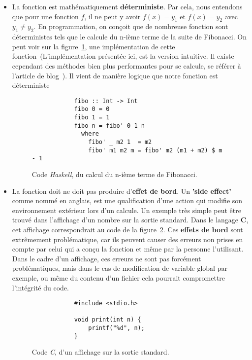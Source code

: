 \begin{itemize}
    \item[\textbullet] La fonction est mathématiquement 
    \textbf{déterministe}. Par cela, nous entendons que pour une fonction \(f\), 
    il ne peut y avoir \(f(x) = y_1\) et \(f(x) = y_2\) avec \(y_1 \neq y_2\). 
    En programmation, on conçoit que de nombreuse fonction 
    sont déterministes tels que le calcule du n-ième terme de la suite de 
    Fibonacci. On peut voir sur la figure~\ref{fig:progFiboHaskell}, une 
    implémentation de cette fonction~(L'implémentation présentée ici, est la 
    version intuitive. Il existe cependant des méthodes bien plus performantes 
    pour se calcule, se référer à l'article de blog~\cite{citationFiboProg}).
    Il vient de manière logique que notre fonction est déterministe
    \begin{figure}[H]
        \begin{verbatim}
            fibo :: Int -> Int
            fibo 0 = 0
            fibo 1 = 1
            fibo n = fibo' 0 1 n
              where
                fibo' _ m2 1  = m2
                fibo' m1 m2 m = fibo' m2 (m1 + m2) $ m - 1
        \end{verbatim}
        \caption{
            Code \textit{Haskell}, du calcul du n-ième terme de Fibonacci.
        }\label{fig:progFiboHaskell}
    \end{figure}

    \item[\textbullet] La fonction doit ne doit pas produire 
    d'\textbf{effet de bord}. Un \textbf{'side effect'} comme nommé en anglais, 
    est une qualification d'une action qui modifie son environnement extérieur 
    lors d'un calcule. Un exemple très simple peut être trouvé dans l'affichage 
    d'un nombre sur la sortie standard. Dans le langage \textbf{C},
    cet affichage correspondrait au code de la figure~\ref{fig:progAfficheC}.
    Ces \textbf{effets de bord} sont extrêmement problématique, car ils 
    peuvent causer des erreurs non prises en compte par celui qui a conçu la 
    fonction et même par la personne l'utilisant. Dans le cadre d'un affichage, 
    ces erreurs ne sont pas forcément problématiques, mais dans le cas de 
    modification de variable global par exemple, ou même du contenu d'un fichier
    cela pourrait compromettre l'intégrité du code.
    \begin{figure}[H]
        \begin{verbatim}
            #include <stdio.h>

            void print(int n) {
                printf("%d", n);
            }
        \end{verbatim}
        \caption{
            Code \textit{C}, d'un affichage sur la sortie standard.
        }\label{fig:progAfficheC}
    \end{figure}
\end{itemize}

